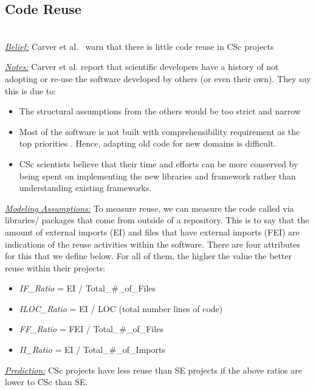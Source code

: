 \documentclass[conference,10pt]{IEEEtran}
\newcommand{\bi}{\begin{itemize}}
\newcommand{\ei}{\end{itemize}}
\begin{document}
\subsection{Code Reuse} ~\\
\noindent \textit{\underline{Belief:}} 
Carver et al.~\cite{segal07_problem, carver06_hpc, Shull05_parallel, sanders08_risk} warn that there is little
code reuse in CSc projects

\noindent \textit{\underline{Notes:}} 
Carver et al. report that scientific developers have a history of not adopting or re-use the software developed by others (or even their own). They 
say this is due to:

\bi
\item The structural assumptions from the others would be too strict and narrow \cite{carver06_hpc, basili08_hpc}
\item Most of the software is not built with comprehensibility requirement as the top priorities \cite{segal07_problem}. Hence, adapting old code for new domains is difficult.
\item
CSc scientists believe that their time and efforts can be more conserved by being spent on implementing the new libraries and framework rather than understanding existing frameworks.
\ei
\noindent \textit{\underline{Modeling Assumptions:}} To
measure reuse, we can measure the  code called
via libraries/ packages that come from outside of a repository. This is to say that the amount of external imports (EI) and files that have external imports (FEI) are indications of the reuse activities within the software. There are four attributes for this that we define below. For all of them, the higher the value the better reuse within their projects: 

\bi
\item \textit{IF\_Ratio} = EI / Total\_\#\_of\_Files
\item \textit{ILOC\_Ratio} = EI / LOC (total number lines of code)
\item \textit{FF\_Ratio} = FEI / Total\_\#\_of\_Files
\item \textit{II\_Ratio} = EI / Total\_\#\_of\_Imports 
\ei


\noindent\textit{\underline{Prediction:}} CSc projects have
less reuse than SE projects if the above ratios
are lower to CSc than SE. 
\end{document}
